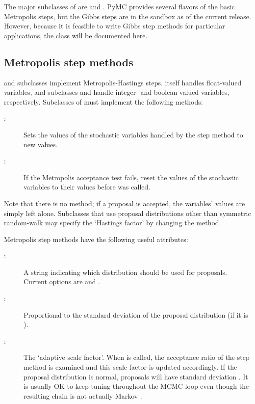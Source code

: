 The major subclasses of  are  and . PyMC provides several flavors of the basic Metropolis steps, but the Gibbs steps are in the sandbox as of the current release. However, because it is feasible to write Gibbs step methods for particular applications, the  class will be documented here.

\hypertarget{metropolis}{}
\subsection*{Metropolis step methods} \label{metropolis}

 and subclasses implement Metropolis-Hastings steps.  itself handles float-valued variables, and subclasses  and  handle integer- and boolean-valued variables, respectively. Subclasses of  must implement the following methods:
\begin{description}
    \item[:] Sets the values of the stochastic variables handled by the step method to new values.
    \item[:] If the Metropolis acceptance test fails, reset the values of the stochastic variables to their values before  was called.
\end{description}
Note that there is no  method; if a proposal is accepted, the variables' values are simply left alone. Subclasses that use proposal distributions other than symmetric random-walk may specify the `Hastings factor' by changing the  method.

Metropolis step methods have the following useful attributes:
\begin{description}
    \item[:] A string indicating which distribution should be used for proposals. Current options are  and .
    \item[:] Proportional to the standard deviation of the proposal distribution (if it is ).
    \item[:] The `adaptive scale factor'. When  is called, the acceptance ratio of the step method is examined and this scale factor is updated accordingly. If the proposal distribution is normal, proposals will have standard deviation . It is usually OK to keep tuning throughout the MCMC loop even though the resulting chain is not actually Markov \cite{tuning}. %
\end{description}

